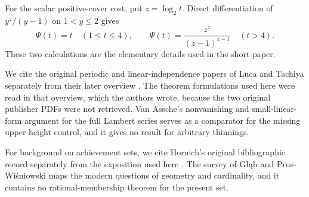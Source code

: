 For the scalar positive-cover cost, put $z=\log_2t$.  Direct differentiation
of $y^z/(y-1)$ on $1<y\le2$ gives
\[
 \Psi(t)=t\quad(1\le t\le4),\qquad
 \Psi(t)=\frac{z^z}{(z-1)^{z-1}}\quad(t>4).
\]
These two calculations are the elementary details used in the
short paper.

We cite the original periodic and linear-independence papers of Luca and Tachiya
separately from their later overview
\cite{lucatachiya2014periodic,lucatachiya2014independence,lucatachiya2017}.
The theorem formulations used here were read in that overview, which the
authors wrote, because the two original publisher PDFs were not retrieved.  Van Assche's nonvanishing and
small-linear-form argument for the full Lambert series
\cite[Lemma~1 and (34)--(35)]{vanassche2001} serves as a comparator for the missing
upper-height control, and it gives no result for arbitrary thinnings.

For background on achievement sets, we cite Hornich's original bibliographic record
\cite{hornich1941} separately from the exposition used here
\cite{nitecki2013}.  The survey of G\l\k{a}b and Prus-Wi\'sniowski
\cite{glabprus2025} maps the modern questions of geometry and cardinality,
and it contains no rational-membership theorem for the present set.

\begingroup
\newcommand{\mword}[4]{\href{https://github.com/wcook04/plectis-erdos/blob/99f4bf47422abbd8757cbb22b50ba079d764d3a7/#1\#L#2}{#4}}
\newcommand{\lword}[4]{\href{https://github.com/wcook04/plectis-erdos/blob/99f4bf47422abbd8757cbb22b50ba079d764d3a7/ErdosProblems/#1\#L#2}{#4}}
